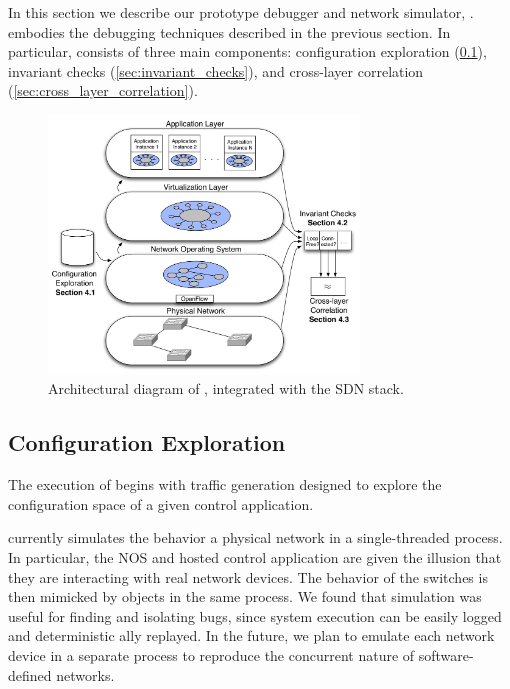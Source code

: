 
In this section we describe our prototype debugger and network simulator, \projectname{}.
\projectname{} embodies the debugging techniques described in the previous section.
In particular, \projectname{} consists of three main components: configuration exploration
(\ref{sec:configuration_exploration}), invariant checks
(\ref{sec:invariant_checks}), and cross-layer correlation
(\ref{sec:cross_layer_correlation}).


\begin{figure}[t]
    \hspace{-10pt}
    \includegraphics[width=3.25in]{../diagrams/architecture/Architecture_simplified.pdf}
    \caption[]{\label{fig:basicarch} Architectural diagram of \projectname{}, integrated with the SDN stack.} 
\end{figure}

\subsection{Configuration Exploration}
\label{sec:configuration_exploration}

The execution of \projectname{} begins with traffic generation designed to explore the configuration
space of a given control application. 

\projectname{} currently simulates the behavior a physical network in a single-threaded process.
In particular, the NOS and hosted control application are given the illusion that
they are interacting with real network devices. The behavior of the
switches is then mimicked by objects in the same process. We found that
simulation was useful for finding and isolating bugs, since system execution
can be easily logged and deterministic ally replayed. In the future, we plan to
emulate each network device in a separate process to reproduce the concurrent
nature of software-defined networks.

